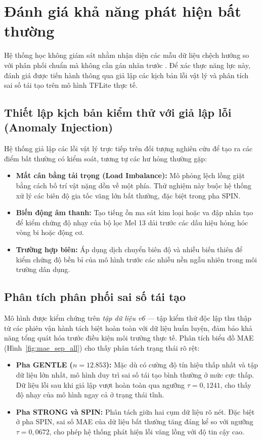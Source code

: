 \section{Đánh giá khả năng phát hiện bất thường}
\label{sec:danh_gia_bat_thuong}

Hệ thống học không giám sát nhằm nhận diện các mẫu dữ liệu chệch hướng so với phân phối chuẩn mà không cần gán nhãn trước \cite{ref_1_6}. Để xác thực năng lực này, đánh giá được tiến hành thông qua giả lập các kịch bản lỗi vật lý và phân tích sai số tái tạo trên mô hình TFLite thực tế.

\subsection{Thiết lập kịch bản kiểm thử với giả lập lỗi (Anomaly Injection)}

Hệ thống giả lập các lỗi vật lý trực tiếp trên đối tượng nghiên cứu để tạo ra các điểm bất thường có kiểm soát, tương tự các hư hỏng thường gặp:

\begin{itemize}
    \item \textbf{Mất cân bằng tải trọng (Load Imbalance):} Mô phỏng lệch lồng giặt bằng cách bố trí vật nặng dồn về một phía. Thử nghiệm này buộc hệ thống xử lý các biên độ gia tốc văng lớn bất thường, đặc biệt trong pha SPIN.
    \item \textbf{Biến động âm thanh:} Tạo tiếng ồn ma sát kim loại hoặc va đập nhân tạo để kiểm chứng độ nhạy của bộ lọc Mel 13 dải trước các dấu hiệu hỏng hóc vòng bi hoặc động cơ.
    \item \textbf{Trường hợp biên:} Áp dụng dịch chuyển biên độ và nhiễu biến thiên để kiểm chứng độ bền bỉ của mô hình trước các nhiễu nền ngẫu nhiên trong môi trường dân dụng.
\end{itemize}

\subsection{Phân tích phân phối sai số tái tạo}

Mô hình được kiểm chứng trên \textit{tập dữ liệu v6} — tập kiểm thử độc lập thu thập từ các phiên vận hành tách biệt hoàn toàn với dữ liệu huấn luyện, đảm bảo khả năng tổng quát hóa trước điều kiện môi trường thực tế. Phân tích biểu đồ MAE (Hình~\ref{fig:mae_sep_all}) cho thấy phân tách trạng thái rõ rệt:

\begin{itemize}
    \item \textbf{Pha GENTLE ($n=12.853$):} Mặc dù có cường độ tín hiệu thấp nhất và tập dữ liệu lớn nhất, mô hình duy trì sai số tái tạo bình thường ở mức cực thấp. Dữ liệu lỗi sau khi giả lập vượt hoàn toàn qua ngưỡng $\tau = 0{,}1241$, cho thấy độ nhạy của mô hình ngay cả ở trạng thái tĩnh.
    \item \textbf{Pha STRONG và SPIN:} Phân tách giữa hai cụm dữ liệu rõ nét. Đặc biệt ở pha SPIN, sai số MAE của dữ liệu bất thường tăng đáng kể so với ngưỡng $\tau = 0{,}0672$, cho phép hệ thống phát hiện lỗi văng lồng với độ tin cậy cao.
\end{itemize}

